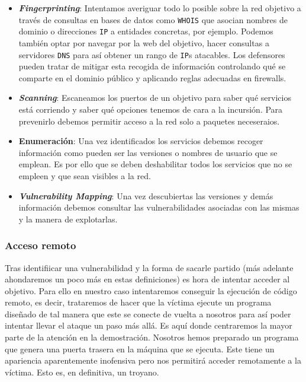 \documentclass[12pt]{article}
\begin{document}
                \begin{itemize}
                    \item \textbf{\textit{Fingerprinting}}: Intentamos averiguar todo lo posible sobre la red objetivo a través de consultas en bases de datos como \texttt{WHOIS} que asocian nombres de dominio o direcciones \texttt{IP} a entidades concretas, por ejemplo. Podemos también optar por navegar por la web del objetivo, hacer consultas a servidores \texttt{DNS} para así obtener un rango de \texttt{IP}s atacables. Los defensores pueden tratar de mitigar esta recogida de información controlando qué se comparte en el dominio público y aplicando reglas adecuadas en firewalls.
                    \item \textbf{\textit{Scanning}}: Escaneamos los puertos de un objetivo para saber qué servicios está corriendo y saber qué opciones tenemos de cara a la incursión. Para prevenirlo debemos permitir acceso a la red solo a paquetes neceseraios.
                   \item \textbf{Enumeración}: Una vez identificados los servicios debemos recoger información como pueden ser las versiones o nombres de usuario que se emplean. Es por ello que se deben deshabilitar todos los servicios que no se empleen y que sean visibles a la red.
                   \item \textbf{\textit{Vulnerability Mapping}}: Una vez descubiertas las versiones y demás información debemos consultar las vulnerabilidades asociadas con las mismas y la manera de explotarlas.
                \end{itemize}

            \subsubsection{Acceso remoto}
                Tras identifiicar una vulnerabilidad y la forma de sacarle partido (más adelante ahondaremos un poco más en estas definiciones) es hora de intentar acceder al objetivo. Para ello en nuestro caso intentaremos conseguir la ejecución de código remoto, es decir, trataremos de hacer que la víctima ejecute un programa diseñado de tal manera que este se conecte de vuelta a nosotros para así poder intentar llevar el ataque un paso más allá. Es aquí donde centraremos la mayor parte de la atención en la demostración. Nosotros hemos preparado un programa que genera una puerta trasera en la máquina que se ejecuta. Este tiene un apariencia aparentemente inofensiva pero nos permitirá acceder remotamente a la víctima. Esto es, en definitiva, un troyano.
\end{document}
